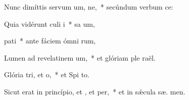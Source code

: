 \item Nunc dimíttis servum um, ne,~* secúndum verbum   ce:
\item Quia vidérunt culi i~* sa um,
\item {} pati~* ante fáciem ómni rum,
\item Lumen ad revelatinem um,~* et glóriam ple  raël.
\item Glória tri, et o,~* et Spi to.
\item Sicut erat in princípio, et , et per,~* et in sǽcula sæ. men.
